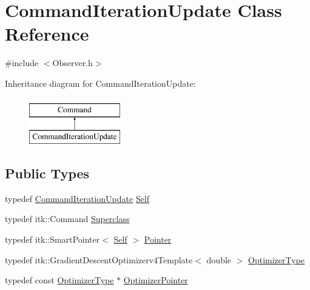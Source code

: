\hypertarget{class_command_iteration_update}{}\section{Command\+Iteration\+Update Class Reference}
\label{class_command_iteration_update}


{\ttfamily \#include $<$Observer.\+h$>$}

Inheritance diagram for Command\+Iteration\+Update\+:\begin{figure}[H]
\begin{center}
\leavevmode
\includegraphics[height=2.000000cm]{class_command_iteration_update}
\end{center}
\end{figure}
\subsection*{Public Types}
\begin{DoxyCompactItemize}
\item 
typedef \hyperlink{class_command_iteration_update}{Command\+Iteration\+Update} \hyperlink{class_command_iteration_update_a82da0970ef8c14141f85f3465f08242e}{Self}
\item 
typedef itk\+::\+Command \hyperlink{class_command_iteration_update_a7321e36a5179cac3cf6dc00de2d5f494}{Superclass}
\item 
typedef itk\+::\+Smart\+Pointer$<$ \hyperlink{class_command_iteration_update_a82da0970ef8c14141f85f3465f08242e}{Self} $>$ \hyperlink{class_command_iteration_update_a07d09836044e93fd8693d947d77a58a5}{Pointer}
\item 
typedef itk\+::\+Gradient\+Descent\+Optimizerv4\+Template$<$ double $>$ \hyperlink{class_command_iteration_update_aa3ff4b0f0b936c866d1bed92cacaf6a1}{Optimizer\+Type}
\item 
typedef const \hyperlink{class_command_iteration_update_aa3ff4b0f0b936c866d1bed92cacaf6a1}{Optimizer\+Type} $\ast$ \hyperlink{class_command_iteration_update_aed2829c5e03b1f7b5e9c862f00f493af}{Optimizer\+Pointer}
\end{DoxyCompactItemize}
